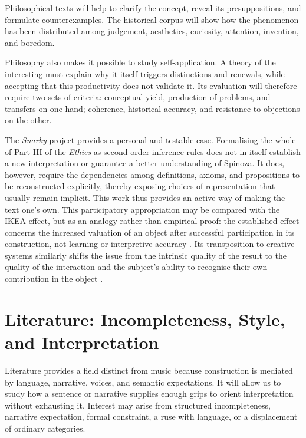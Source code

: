 \documentclass[11pt,a4paper]{article}
\begin{document}
Philosophical texts will help to clarify the concept, reveal its presuppositions,
and formulate counterexamples.
The historical corpus will show how the phenomenon has been distributed among
judgement, aesthetics, curiosity, attention, invention, and boredom.

Philosophy also makes it possible to study self-application. A theory of the interesting
must explain why it itself triggers distinctions and renewals, while accepting
that this productivity does not validate it. Its evaluation will therefore
require two sets of criteria: conceptual yield, production of problems, and
transfers on one hand; coherence, historical accuracy, and resistance to
objections on the other.

The \emph{Snarky} project provides a personal and testable case. Formalising the
whole of Part III of the \emph{Ethics} as second-order inference rules does not
in itself establish a new interpretation or guarantee a better understanding of
Spinoza. It does, however, require the dependencies among definitions, axioms,
and propositions to be reconstructed explicitly, thereby exposing choices of
representation that usually remain implicit. This work thus provides an active
way of making the text one's own. This participatory appropriation may be
compared with the IKEA effect, but as an analogy rather than empirical proof:
the established effect concerns the increased valuation of an object after
successful participation in its construction, not learning or interpretive
accuracy \parencite{norton2012ikea}. Its transposition to creative systems
similarly shifts the issue from the intrinsic quality of the result to the
quality of the interaction and the subject's ability to recognise their own
contribution in the object \parencite[152--153]{pachet2026generation}.

\section{Literature: Incompleteness, Style, and Interpretation}

Literature provides a field distinct from music because construction is
mediated by language, narrative, voices, and semantic expectations. It will
allow us to study how a sentence or narrative supplies enough grips to orient
interpretation without exhausting it. Interest may arise from structured
incompleteness, narrative expectation, formal constraint, a ruse with language,
or a displacement of ordinary categories.
\end{document}
